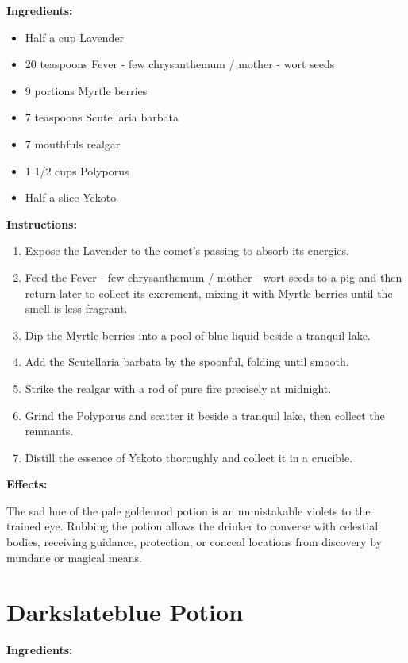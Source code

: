 \documentclass{article}
\begin{document}
\textbf{Ingredients:}

\begin{itemize}
  \item Half a cup Lavender
  \item 20 teaspoons Fever - few chrysanthemum / mother - wort seeds
  \item 9 portions Myrtle berries
  \item 7 teaspoons Scutellaria barbata
  \item 7 mouthfuls realgar
  \item 1 1/2 cups Polyporus
  \item Half a slice Yekoto
\end{itemize}

\textbf{Instructions:}

\begin{enumerate}
  \item Expose the Lavender to the comet’s passing to absorb its energies.
  \item Feed the Fever - few chrysanthemum / mother - wort seeds to a pig and then return later to collect its excrement, mixing it with Myrtle berries until the smell is less fragrant.
  \item Dip the Myrtle berries into a pool of blue liquid beside a tranquil lake.
  \item Add the Scutellaria barbata by the spoonful, folding until smooth.
  \item Strike the realgar with a rod of pure fire precisely at midnight.
  \item Grind the Polyporus and scatter it beside a tranquil lake, then collect the remnants.
  \item Distill the essence of Yekoto thoroughly and collect it in a crucible.
\end{enumerate}

\textbf{Effects:}

The sad hue of the pale goldenrod potion is an unmistakable violets to the trained eye. Rubbing the potion allows the drinker to converse with celestial bodies, receiving guidance, protection, or conceal locations from discovery by mundane or magical means.

\newpage
\section*{Darkslateblue Potion}

\textbf{Ingredients:}
\end{document}
